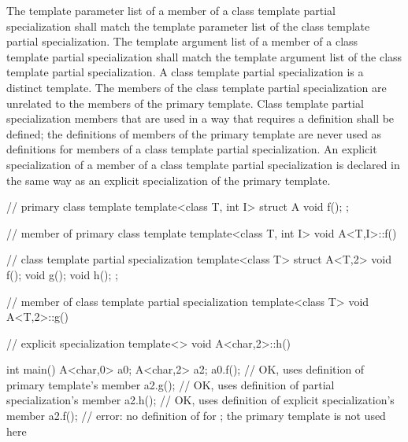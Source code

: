 \pnum
The template parameter list of a member of a class template partial
specialization shall match the template parameter list of the class template
partial specialization.
The template argument list of a member of a class template partial
specialization shall match the template argument list of the class template
partial specialization.
A class template partial specialization is a distinct template.
The members of the class template partial specialization are
unrelated to the members of the primary template.
Class template partial specialization members that are used in a way that
requires a definition shall be defined; the definitions of members of the
primary template are never used as definitions for members of a class
template partial specialization.
An explicit specialization of a member of a class template partial
specialization is declared in the same way as an explicit specialization of
the primary template.
\begin{example}
\begin{codeblock}
// primary class template
template<class T, int I> struct A {
  void f();
};

// member of primary class template
template<class T, int I> void A<T,I>::f() { }

// class template partial specialization
template<class T> struct A<T,2> {
  void f();
  void g();
  void h();
};

// member of class template partial specialization
template<class T> void A<T,2>::g() { }

// explicit specialization
template<> void A<char,2>::h() { }

int main() {
  A<char,0> a0;
  A<char,2> a2;
  a0.f();           // OK, uses definition of primary template's member
  a2.g();           // OK, uses definition of partial specialization's member
  a2.h();           // OK, uses definition of explicit specialization's member
  a2.f();           // error: no definition of  for ; the primary template is not used here
}
\end{codeblock}
\end{example}

